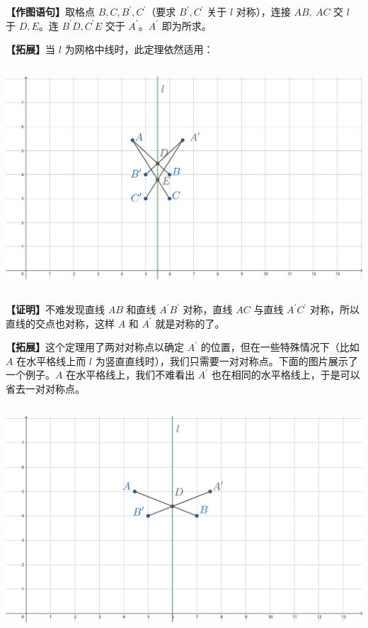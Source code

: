 \documentclass[UTF8]{article}
\begin{document}
\textbf{【作图语句】}取格点 \(B,C,B^{'},C^{'}\)（要求 \(B^{'},C^{'}\)
关于 \(l\) 对称），连接 \(AB,\ AC\) 交 \(l\) 于 \(D,E\)。连
\(B^{'}D,C^{'}E\) 交于 \(A^{'}\)。\(A^{'}\) 即为所求。

\textbf{【拓展】}当 \(l\) 为网格中线时，此定理依然适用：

\includegraphics[width=5.76806in,height=3.27847in]{media/image2.png}

\textbf{【证明】}不难发现直线 \(AB\) 和直线 \(A^{'}B^{'}\) 对称，直线
\(AC\) 与直线 \(A^{'}C^{'}\) 对称，所以直线的交点也对称，这样 \(A\) 和
\(A^{'}\) 就是对称的了。

\textbf{【拓展】}这个定理用了两对对称点以确定 \(A^{'}\)
的位置，但在一些特殊情况下（比如 \(A\) 在水平格线上而 \(l\)
为竖直直线时），我们只需要一对对称点。下面的图片展示了一个例子。\(A\)
在水平格线上，我们不难看出 \(A^{'}\)
也在相同的水平格线上，于是可以省去一对对称点。

\includegraphics[width=5.76806in,height=3.33611in]{media/image3.png}
\end{document}
